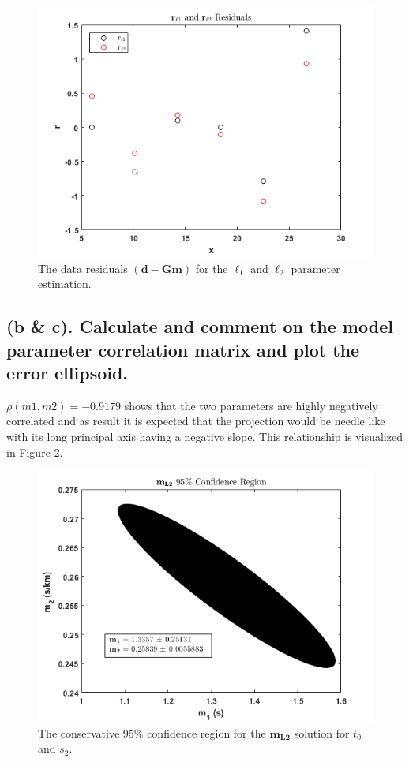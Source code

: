 \documentclass{article}
\begin{document}
\begin{figure}[t]
    \centering
    \includegraphics[width = .875\textwidth]{residuals_l1l2.png}
    \caption{The data residuals $(\mathbf{d - Gm})$ for the $\ell _1$ and $\ell _2$ parameter estimation.}
    \label{fig:residuals}
\end{figure}
\FloatBarrier
\subsection*{(b \& c). Calculate and comment on the model parameter correlation matrix and plot the error ellipsoid.}
$ \rho (m 1, m 2)=-0.9179 $ shows that the two parameters are highly negatively correlated and as result it is expected that the projection would be needle like with its long principal axis having a negative slope. This relationship is visualized in Figure \ref{fig:ellipsoid}.

\begin{figure}[p]
    \centering
    \includegraphics[width = .875\textwidth]{ml2_confidenceRegion.png}
    \caption{The conservative 95\% confidence region for the $\mathbf{m_{L2}}$ solution for $t_0$ and $s_2$. }
    \label{fig:ellipsoid}
\end{figure}
\end{document}
